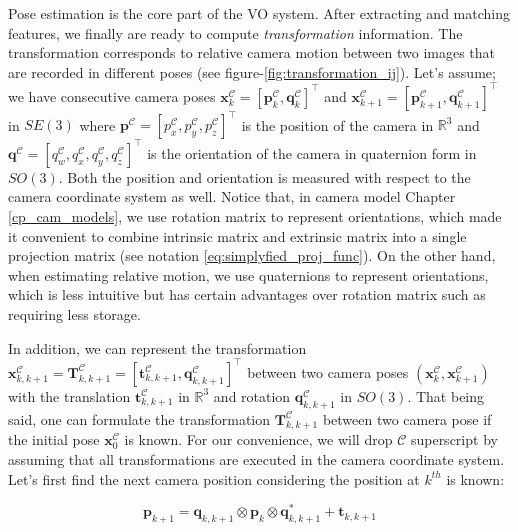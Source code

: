 \documentclass[a4paper]{report}
\numberwithin{figure}{section}
\newcommand{\R}{\mathbb{R}}
\begin{document}
Pose estimation is the core part of the VO system. After extracting and 
matching features, we finally are ready to compute \textit{transformation} 
information. The transformation corresponds to relative camera motion between 
two images that are recorded in different poses (see 
figure-\ref{fig:transformation_ij}). Let's assume; we have consecutive camera 
poses $\mathbf{x}_{k}^{\mathcal{C}} = [\mathbf{p}_k^{\mathcal{C}}, 
\mathbf{q}_k^{\mathcal{C}}]^\top$ and 
$\mathbf{x}_{k+1}^{\mathcal{C}} = 
[\mathbf{p}_{k+1}^{\mathcal{C}}, \mathbf{q}_{k+1}^{\mathcal{C}}]^\top$ in 
$SE(3)$ 
where 
$\mathbf{p}^{\mathcal{C}} = [p_x^{\mathcal{C}}, 
p_y^{\mathcal{C}}, p_z^{\mathcal{C}}]^\top$ 
is the position of the camera in $\R^3$ and 
$\mathbf{q}^{\mathcal{C}} = [q_w^{\mathcal{C}}, q_x^{\mathcal{C}}, 
q_y^{\mathcal{C}}, 
q_z^{\mathcal{C}}]^\top$ is the orientation of the camera in quaternion 
form in 
$SO(3)$. Both the position and orientation is measured with respect to the 
camera coordinate system as well.  
Notice that, in camera model Chapter \ref{cp_cam_models}, we use rotation 
matrix to represent orientations, which made it convenient to combine 
intrinsic matrix and extrinsic matrix into a single projection matrix (see 
notation \eqref{eq:simplyfied_proj_func}). On the other hand, when estimating 
relative motion, we use 
quaternions to represent orientations, which is less intuitive but has 
certain advantages over rotation matrix such as requiring less storage.  

In addition, we can represent the transformation 
$\mathbf{x}_{k,k+1}^{\mathcal{C}} 
= 
\mathbf{T}_{k,k+1}^{\mathcal{C}}= 
[\mathbf{t}_{k,k+1}^{\mathcal{C}},\mathbf{q}_{k,k+1}^{\mathcal{C}}]^\top$ 
between 
two camera poses 
$(\mathbf{x}_k^{\mathcal{C}},\mathbf{x}_{k+1}^{\mathcal{C}})$ with the 
translation $\mathbf{t}_{k,k+1}^{\mathcal{C}}$ in $\R^3$ and  
rotation $\mathbf{q}_{k,k+1}^{\mathcal{C}}$ in $SO(3)$. 
That being said, 
one can formulate the transformation $\mathbf{T}_{k,k+1}^{\mathcal{C}}$ 
between two camera 
pose if the initial pose $\mathbf{x}_{0}^{\mathcal{C}}$ is known. 
For our convenience, we will drop $\mathcal{C}$ superscript by assuming that 
all transformations are executed in the camera coordinate system. 
Let's first find the next camera position considering the position at $k^{th}$ 
is known:

\begin{equation}\label{eq:translation_cam}
  \mathbf{p}_{k+1} = 
\mathbf{q}_{k,k+1} \otimes \mathbf{p}_k \otimes \mathbf{q}_{k,k+1}^* + 
  \mathbf{t}_{k,k+1}
\end{equation}
\end{document}
